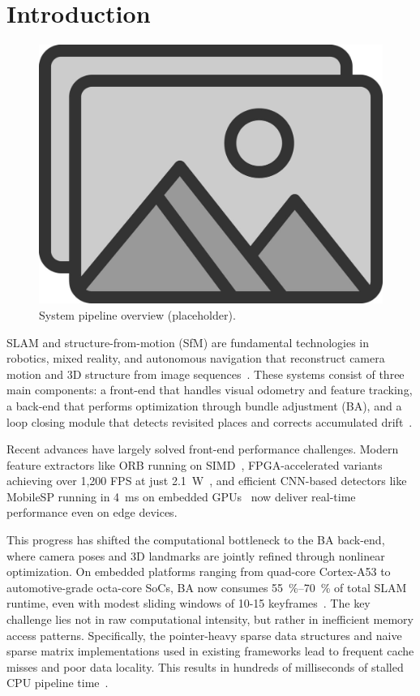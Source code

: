 \section{Introduction}\label{sec:intro}


\begin{figure}[t]
  \centering
  \includegraphics[width=0.9\linewidth]{figs/placeholder}
  \caption{System pipeline overview (placeholder).}
  \label{fig:intro_pipeline}
\end{figure}

 SLAM and structure-from-motion (SfM) are fundamental technologies in robotics, 
mixed reality, and autonomous navigation that reconstruct camera motion and 3D structure from image 
sequences~\cite{cadena2016past,hartley2003multiple}. These systems consist of three main components: 
a front-end that handles visual odometry and feature tracking, a back-end that performs optimization through 
bundle adjustment (BA), and a loop closing module that detects revisited places and corrects accumulated 
drift~\cite{campos2021orb}.

Recent advances have largely solved front-end performance challenges. Modern feature extractors like ORB 
running on SIMD~\cite{rublee2011orb}, FPGA-accelerated variants achieving over 1,200 FPS at just 
\SI{2.1}{\watt}~\cite{fang2017fpga}, and efficient CNN-based detectors like MobileSP running in \SI{4}{ms} 
on embedded GPUs~\cite{liu2022mobilesp} now deliver real-time performance even on edge devices. 

This progress has shifted the computational bottleneck to the BA back-end, where camera poses and 3D landmarks 
are jointly refined through nonlinear optimization. On embedded platforms ranging from quad-core Cortex-A53 to 
automotive-grade octa-core SoCs, BA now consumes \SIrange{55}{70}{\percent} of total SLAM runtime, even with 
modest sliding windows of 10-15 keyframes~\cite{semenova2022quantitative}. The key challenge lies not in raw 
computational intensity, but rather in inefficient memory access patterns. Specifically, the pointer-heavy sparse 
data structures and naive sparse matrix implementations used in existing frameworks lead to frequent cache misses 
and poor data locality. This results in hundreds of milliseconds of stalled CPU pipeline time~\cite{qin2019pi}.

